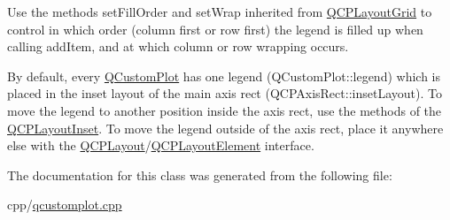 Use the methods set\+Fill\+Order and set\+Wrap inherited from \mbox{\hyperlink{class_q_c_p_layout_grid}{Q\+C\+P\+Layout\+Grid}} to control in which order (column first or row first) the legend is filled up when calling add\+Item, and at which column or row wrapping occurs.

By default, every \mbox{\hyperlink{class_q_custom_plot}{Q\+Custom\+Plot}} has one legend (Q\+Custom\+Plot\+::legend) which is placed in the inset layout of the main axis rect (Q\+C\+P\+Axis\+Rect\+::inset\+Layout). To move the legend to another position inside the axis rect, use the methods of the \mbox{\hyperlink{class_q_c_p_layout_inset}{Q\+C\+P\+Layout\+Inset}}. To move the legend outside of the axis rect, place it anywhere else with the \mbox{\hyperlink{class_q_c_p_layout}{Q\+C\+P\+Layout}}/\mbox{\hyperlink{class_q_c_p_layout_element}{Q\+C\+P\+Layout\+Element}} interface. 

The documentation for this class was generated from the following file\+:\begin{DoxyCompactItemize}
\item 
cpp/\mbox{\hyperlink{qcustomplot_8cpp}{qcustomplot.\+cpp}}\end{DoxyCompactItemize}
